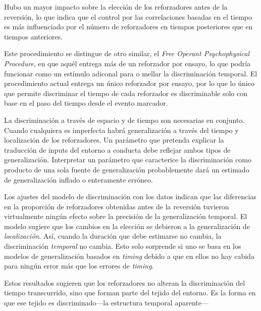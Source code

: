 \documentclass[a4paper,12pt]{article}
\begin{document}
Hubo un mayor impacto sobre la elección de los reforzadores antes de la reversión, lo que indica que el control por las correlaciones basadas en el tiempo es más influenciado por el número de reforzadores en tiempos posteriores que en tiempos anteriores.

Este procedimiento se distingue de otro similar, el {\itshape Free Operant Psychophysical Procedure}, en que aquél entrega más de un reforzador por ensayo, lo que podría funcionar como un estímulo adiconal para o mellar la discriminación temporal.
El procedimiento actual entrega un único reforzador por ensayo, por lo que lo único que permite discriminar el tiempo de cada reforzador es discriminable solo con base en el paso del tiempo desde el evento marcador.

La discriminación a través de espacio y de tiempo son necesarias en conjunto.
Cuando cualquiera es imperfecta habrá generalización a través del tiempo y localización de los reforzadores.
Un parámetro que pretenda explicar la traducción de inputs del entorno a conducta debe reflejar ambos tipos de generalización.
Interpretar un parámetro que caracterice la discriminación como producto de una sola fuente de generalización probablemente dará un estimado de generalización inflado o enteramente erróneo.

Los ajustes del modelo de discriminación con los datos indican que las diferencias en la proporción de reforzadores obtenidas antes de la reversión tuvieron virtualmente ningún efecto sobre la precisión de la generalización temporal.
El modelo sugiere que los cambios en la elección se debieron a la generalización de {\itshape localización}.
Así, cuando la duración que debe estimarse no cambia, la discriminación {\itshape temporal} no cambia.
Esto solo sorprende si uno se basa en los modelos de generalización basados en {\itshape timing} debido a que en ellos no hay cabida para ningún error más que los errores de {\itshape timing}.

Estos resultados sugieren que los reforzadores no alteran la discriminación del tiempo transcurrido, sino que forman parte del tejido del entorno. Es la forma en que ese tejido es discriminado---la estructura temporal aparente---
\end{document}
